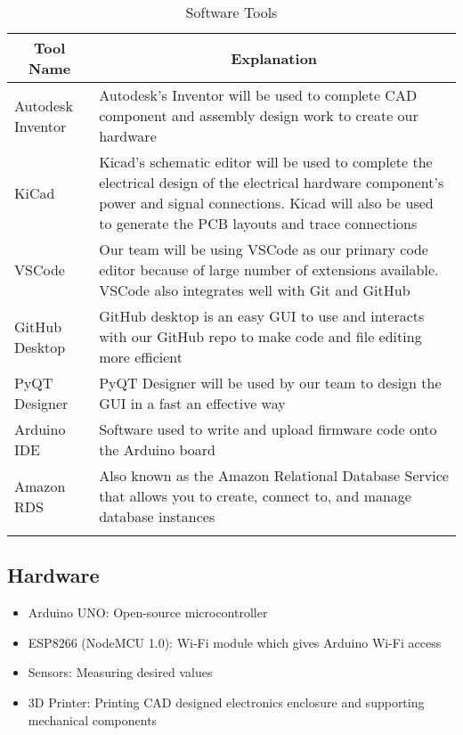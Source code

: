 \documentclass[12pt]{article}
\begin{document}
	\begin{longtable}{|p{6cm}|p{10cm}|}
		\hline
		\multicolumn{1}{|c|}{\textbf{Tool Name}} & \multicolumn{1}{c|}{\textbf{Explanation}} 
		\\ \hline
		Autodesk Inventor
		&  Autodesk's Inventor will be used to complete CAD component and assembly design work to create our hardware  
		\newline                              
		\\ \hline
		KiCad
		& Kicad's schematic editor will be used to complete the electrical design of the electrical hardware component's power and signal connections. Kicad will also be used to generate the PCB layouts and trace connections
		\newline                              
		\\ \hline
		VSCode
		&  Our team will be using VSCode as our primary code editor because of large number of extensions available. VSCode also integrates well with Git and GitHub
		\newline                              
		\\ \hline
		GitHub Desktop
		&  GitHub desktop is an easy GUI to use and interacts with our GitHub repo to make code and file editing more efficient
		\newline                              
		\\ \hline
		PyQT Designer
		&  PyQT Designer will be used by our team to design the GUI in a fast an effective way
		\newline                     
		\\ \hline
		Arduino IDE
		&  Software used to write and upload firmware code onto the Arduino board
		\newline                     
		\\ \hline
		Amazon RDS
		&  Also known as the Amazon Relational Database Service that allows you to create, connect to, and manage database instances
		\newline                     
		\\ \hline
		\caption{Software Tools}
	\end{longtable}



\subsection{Hardware}
\begin{itemize}
	\item Arduino UNO: Open-source microcontroller 
	\item ESP8266 (NodeMCU 1.0): Wi-Fi module which gives Arduino Wi-Fi access
	\item Sensors: Measuring desired values
	\item 3D Printer: Printing CAD designed electronics enclosure and supporting mechanical components
\end{itemize}
\end{document}
